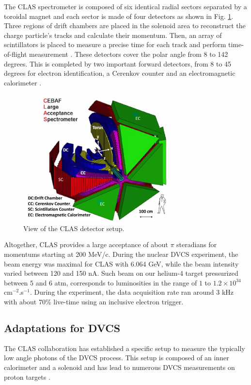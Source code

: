 \documentclass[aps,prc,preprint,superscriptaddress]{revtex4}
\begin{document}
The CLAS spectrometer \cite{Mecking:2003zu} is composed of six identical radial 
sectors separated by a toroidal magnet and each sector is made of four detectors 
as shown in Fig. \ref{fig:CLAS}.  Three regions of drift chambers \cite{Mestayer:2000we} 
are placed in the solenoid area to reconstruct the charge particle's tracks and 
calculate their momentum. Then, an array of scintillators is placed to measure 
a precise time for each track and perform time-of-flight measurement 
\cite{Smith:1999ii}. These detectors cover the polar angle from 8 to 142 degrees. 
This is completed by two important forward detectors, from 8 
to 45 degrees for electron identification, a Cerenkov counter 
\cite{Adams:2001kk} and an electromagnetic calorimeter \cite{Amarian:2001zs}. 

\begin{figure}[tbp!]
\center
\includegraphics[width=8cm]{fig3/CLAS_geantview-PS.jpg}
	\caption{View of the CLAS detector setup.}
\label{fig:CLAS}
\end{figure}


Altogether, CLAS provides a large acceptance of about $\pi$ steradians for momentums 
starting at 200 MeV/c. During the nuclear DVCS experiment,
the beam energy was maximal for CLAS with 6.064 GeV, while the beam intensity varied
between 120 and 150 nA. Such beam on our helium-4 target pressurized between 5 and 6 atm,
corresponds to luminosities in the range of $1$ to $1.2 \times 10^{34}$ cm$^{-2}$.s$^{-1}$.
During the experiment, the data acquisition rate ran around 3 kHz with about 70\% live-time
using an inclusive electron trigger. 

\subsection{Adaptations for DVCS}

The CLAS collaboration has established a specific setup to measure the typically 
low angle photons of the DVCS process. This setup is composed of an inner 
calorimeter and a solenoid and has lead to numerous DVCS measurements on proton 
targets \cite{Seder:2014cdc,Jo:2015ema,HirlingerSaylor:2018bnu}.
\end{document}
